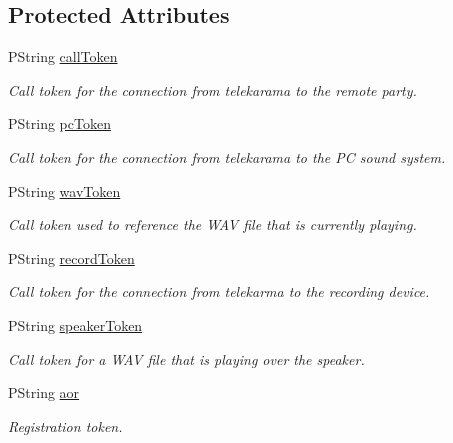 \subsection*{Protected Attributes}
\begin{CompactItemize}
\item 
PString \hyperlink{classTelephonyIfc_3541fbc8e53e233226678ef3033b591f}{callToken}
\begin{CompactList}\small\item\em Call token for the connection from telekarama to the remote party. \item\end{CompactList}\item 
PString \hyperlink{classTelephonyIfc_86cd9e4c5ffe313c8aa4b73b02a02a47}{pcToken}
\begin{CompactList}\small\item\em Call token for the connection from telekarama to the PC sound system. \item\end{CompactList}\item 
PString \hyperlink{classTelephonyIfc_54799c28302aba6f7adb8c8ef438503e}{wavToken}
\begin{CompactList}\small\item\em Call token used to reference the WAV file that is currently playing. \item\end{CompactList}\item 
PString \hyperlink{classTelephonyIfc_616675027eef53f520b9ac96b81a56b0}{recordToken}
\begin{CompactList}\small\item\em Call token for the connection from telekarma to the recording device. \item\end{CompactList}\item 
PString \hyperlink{classTelephonyIfc_fa97c7205d0ade2e6cc21f9f1b1466bc}{speakerToken}
\begin{CompactList}\small\item\em Call token for a WAV file that is playing over the speaker. \item\end{CompactList}\item 
PString \hyperlink{classTelephonyIfc_b4e274c6a138a5e08ead646eda38613e}{aor}
\begin{CompactList}\small\item\em Registration token. \item\end{CompactList}\item 

\end{CompactItemize}
